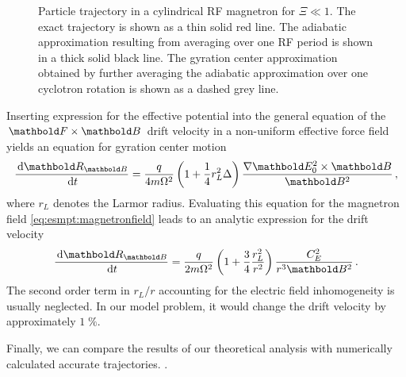 \begin{figure}
\caption{Particle trajectory in a cylindrical \ac{RF} magnetron
for $\Xi\ll 1$.
The exact trajectory is shown as a thin solid red line. The
adiabatic approximation resulting from averaging over one
\ac{RF} period is shown in a thick solid black line. The gyration
center approximation obtained by further averaging the
adiabatic approximation over one cyclotron rotation is shown
as a dashed grey line.}
\label{fig:esmpt:traj}
\end{figure}

Inserting expression for the effective potential
into the general equation of the $\mb F\times \mb B$ 
drift velocity in a non-uniform
effective force field \citep{baumjohan2012} yields an equation
for gyration center motion 
\begin{equation}
\frac{\de \mb R_{\mb B}}{\de t} = 
\frac{q}{4m\Omega^2}
\left(1+\frac{1}{4}r_L^2\Delta\right)
\frac{\nabla\mb E_0^2\times\mb B}{\mb B^2}\,,
\end{equation}
where $r_L$ denotes the Larmor radius.
Evaluating this equation
for the magnetron field \eqref{eq:esmpt:magnetronfield} leads
to an analytic expression for the drift velocity
\begin{equation}
\frac{\de \mb R_{\mb B}}{\de t} = 
\frac{q}{2m\Omega^2}
\left(1+\frac{3}{4}\frac{r_L^2}{r^2}\right)
\frac{C_E^2}{r^3\mb B^2}\,.
\end{equation}
The second order term in $r_L/r$ accounting for the electric field
inhomogeneity is usually neglected. In our model problem, it would
change the drift velocity by approximately $1\;\%$.

Finally, we can compare the results of our theoretical analysis with
numerically calculated accurate trajectories.
.

